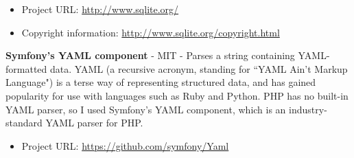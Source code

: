 \begin{itemize}
\item Project URL: \url{http://www.sqlite.org/}
\item Copyright information: \url{http://www.sqlite.org/copyright.html}
\end{itemize}

\textbf{Symfony's YAML component} - MIT - Parses a string containing YAML-formatted data. YAML (a recursive acronym, standing for ``YAML Ain't Markup Language") is a terse way of representing structured data, and has gained popularity for use with languages such as Ruby and Python. PHP has no built-in YAML parser, so I used Symfony's YAML component, which is an industry-standard YAML parser for PHP.

\begin{itemize}
\item Project URL: \url{https://github.com/symfony/Yaml}
\end{itemize}